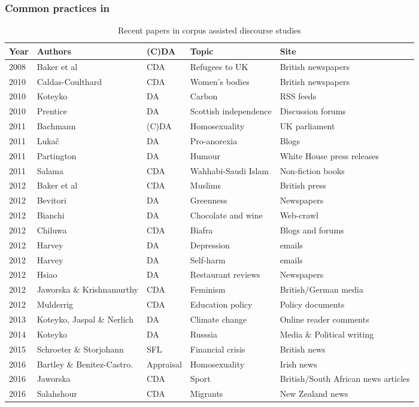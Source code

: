 \subsubsection{Common practices in } \label{sect:compraccads}


\begin{table}[htb] 
\centering
\resizebox{12cm}{!} {
\begin{tabular}{lllll}

\toprule
Year & Authors & (C)DA & Topic & Site \\ \midrule
2008 & Baker et al & \gls{CDA} & Refugees to UK & British newspapers \\ 
2010 & Caldas-Coulthard & \gls{CDA} & Women's bodies & British newspapers \\  
2010 & Koteyko & DA & Carbon & RSS feeds \\ 
2010 & Prentice & DA & Scottish independence & Discussion forums \\  
2011 & Bachmann & (C)DA & Homosexuality & UK parliament \\  
2011 & Luka\v{c} & DA & Pro-anorexia & Blogs \\  
2011 & Partington & DA & Humour & White House press releases \\  
2011 & Salama & \gls{CDA} & Wahhabi-Saudi Islam & Non-fiction books \\  
2012 & Baker et al & \gls{CDA} & Muslims & British press \\  
2012 & Bevitori & DA & Greenness & Newspapers \\  2012 & Bianchi & DA & Chocolate and wine & Web-crawl \\
2012 & Chiluwa & \gls{CDA} & Biafra & Blogs and forums \\  
2012 & Harvey & DA & Depression & emails \\  
2012 & Harvey & DA & Self-harm & emails \\
2012 & Hsiao & DA & Restaurant reviews & Newspapers \\  
2012 & Jaworska \& Krishnamurthy & \gls{CDA} & Feminism & British\slash German media \\ 
2012 & Mulderrig & \gls{CDA} & Education policy & Policy documents \\  
2013 & Koteyko, Jaspal \& Nerlich & DA & Climate change & Online reader comments \\
2014 & Koteyko & DA & Russsia & Media \& Political writing \\
2015 & Schroeter \& Storjohann & SFL & Financial crisis & British news \\
2016 & Bartley \& Benitez-Castro. & Appraisal & Homosexuality & Irish news \\
2016 & Jaworska & CDA & Sport & British\slash South African news articles \\ 
2016 & Salahshour & CDA & Migrants & New Zealand news \\
\bottomrule  \end{tabular} }  
\caption[Recent papers in CADS]{Recent papers in corpus assisted discourse studies}
\label{table:cads} 
\end{table}

